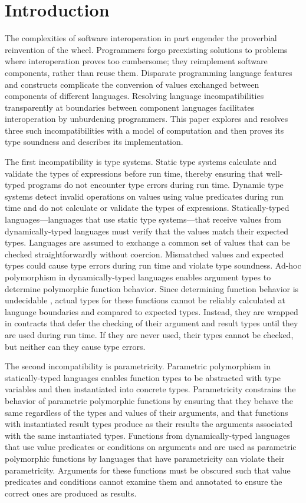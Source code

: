 \chapter{Introduction}

The complexities of software interoperation in part engender the proverbial reinvention of the wheel.  Programmers forgo preexisting solutions to problems where interoperation proves too cumbersome; they reimplement software components, rather than reuse them.  Disparate programming language features and constructs complicate the conversion of values exchanged between components of different languages.  Resolving language incompatibilities transparently at boundaries between component languages facilitates interoperation by unburdening programmers.  This paper explores and resolves three such incompatibilities with a model of computation and then proves its type soundness and describes its implementation.

The first incompatibility is type systems.  Static type systems calculate and validate the types of expressions before run time, thereby ensuring that well-typed programs do not encounter type errors during run time.  Dynamic type systems detect invalid operations on values using value predicates during run time and do not calculate or validate the types of expressions.  Statically-typed languages---languages that use static type systems---that receive values from dynamically-typed languages must verify that the values match their expected types.  Languages are assumed to exchange a common set of values that can be checked straightforwardly without coercion.  Mismatched values and expected types could cause type errors during run time and violate type soundness.  Ad-hoc polymorphism in dynamically-typed languages enables argument types to determine polymorphic function behavior.  Since determining function behavior is undecidable \cite{blume04}, actual types for these functions cannot be reliably calculated at language boundaries and compared to expected types.  Instead, they are wrapped in contracts \cite{findler02} that defer the checking of their argument and result types until they are used during run time.  If they are never used, their types cannot be checked, but neither can they cause type errors.

The second incompatibility is parametricity.  Parametric polymorphism in statically-typed languages enables function types to be abstracted with type variables and then instantiated into concrete types.  Parametricity constrains the behavior of parametric polymorphic functions by ensuring that they behave the same regardless of the types and values of their arguments, and that functions with instantiated result types produce as their results the arguments associated with the same instantiated types.  Functions from dynamically-typed languages that use value predicates or conditions on arguments and are used as parametric polymorphic functions by languages that have parametricity can violate their parametricity.  Arguments for these functions must be obscured such that value predicates and conditions cannot examine them and annotated to ensure the correct ones are produced as results.

